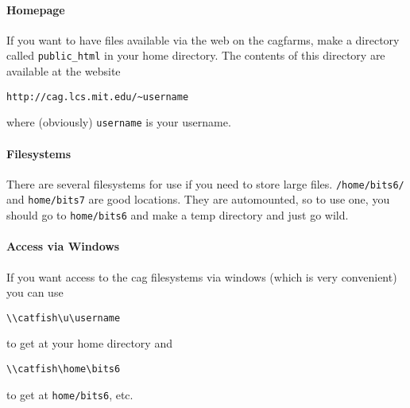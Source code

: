 \paragraph{Homepage}
If you want to have files available via the web on the cagfarms, make
a directory called {\tt public\_html} in your home directory. The contents
of this directory are available at the website \\
\begin{verbatim}
http://cag.lcs.mit.edu/~username
\end{verbatim}
 where (obviously) {\tt username} is your username.

\paragraph{Filesystems}
There are several filesystems for use if you need to store large files.
{\tt /home/bits6/} and {\tt home/bits7} are good locations. They are
automounted, so to use one, you should go to {\tt home/bits6} and make 
a temp directory and just go wild. 

\paragraph{Access via Windows}
If you want access to the cag filesystems via windows
(which is very convenient) you can use
\begin{verbatim}
\\catfish\u\username
\end{verbatim}
to get at your home directory and 
\begin{verbatim}
\\catfish\home\bits6
\end{verbatim}
 to get at {\tt home/bits6}, etc.

